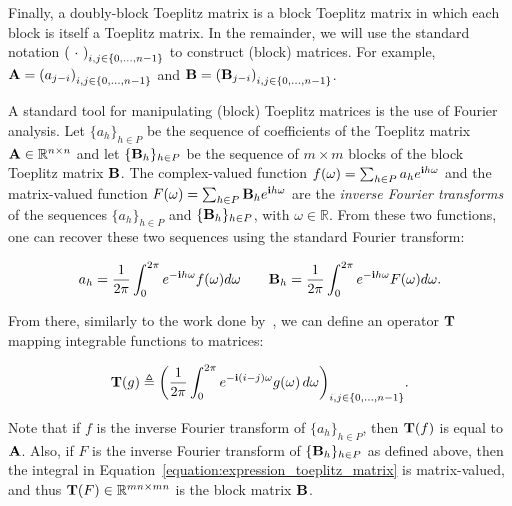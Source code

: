 {Finally, a doubly-block Toeplitz matrix is a block Toeplitz matrix in which each block is itself a Toeplitz matrix.
In the remainder, we will use the standard notation $\leftmat\ \cdot\ \rightmat_{i,j \in \{0,\ldots,n-1\}}$ to construct (block) matrices.
For example, $\Amat = \leftmat a_{j-i} \rightmat_{i,j \in \{0,\ldots,n-1\}}$ and $\Bmat = \leftmat \Bmat_{j-i} \rightmat_{i,j \in \{0,\ldots,n-1\}}$.

A standard tool for manipulating (block) Toeplitz matrices is the use of Fourier analysis.
Let $\{a_h\}_{h \in P}$ be the sequence of coefficients of the Toeplitz matrix $\mathbf{A} \in \mathbb{R}^{n\times n}$ and let $\{\mathbf{B}_h\}_{h \in P}$ be the sequence of $m\times m$ blocks of the block Toeplitz matrix $\mathbf{B}$.
The complex-valued function $f(\omega) = \sum_{h \in P} a_h e^{\mathbf{i} h \omega}$ and the matrix-valued function $F(\omega) = \sum_{h \in P} \mathbf{B}_h e^{\mathbf{i} h \omega}$ are the \emph{inverse Fourier transforms} of the sequences $\{a_h\}_{h \in P}$ and $\{\mathbf{B}_h\}_{h \in P}$, with $\omega \in \mathbb{R}$.
From these two functions, one can recover these two sequences using the standard Fourier transform:

\begin{equation}
  a_h = \frac{1}{2\pi} \int_0^{2\pi} e^{-\mathbf{i} h \omega} f(\omega) d\omega \quad \quad \mathbf{B}_h = \frac{1}{2\pi} \int_0^{2\pi} e^{-\mathbf{i} h \omega} F(\omega) d\omega .
\end{equation}

From there, similarly to the work done by~\citet{gray2006toeplitz,gutierrez2012block}, we can define an operator $\mathbf{T}$ mapping integrable functions to matrices:

\begin{equation}
  \Tmat(g)  \triangleq\leftmat\frac{1}{2\pi}\int_{0}^{2\pi}e^{-\ci(i-j)\omega}g(\omega)\,d\omega\rightmat_{i,j\in\{0,\ldots,n-1\}} . \label{equation:expression_toeplitz_matrix}
\end{equation}

Note that if $f$ is the inverse Fourier transform of $\{a_h\}_{h \in P}$, then $\mathbf{T}(f)$ is equal to $\mathbf{A}$.
Also, if $F$ is the inverse Fourier transform of $\{\mathbf{B}_h\}_{h \in P}$ as defined above, then the integral in Equation~\ref{equation:expression_toeplitz_matrix} is matrix-valued, and thus $\mathbf{T}(F) \in \mathbb{R}^{mn \times mn}$ is the block matrix $\mathbf{B}$.



}
